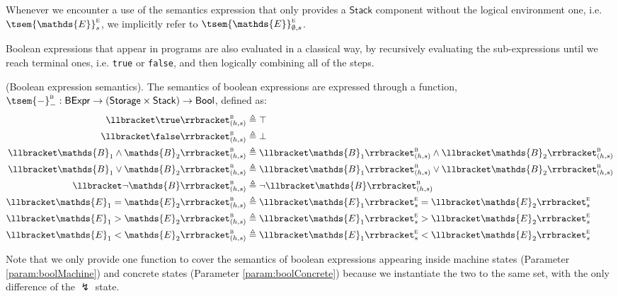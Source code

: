 Whenever we encounter a use of the semantics expression that only provides a $\mathsf{Stack}$ component without the logical environment one, i.e. $\tsem{\mathds{E}}_s^\textsc{e}$, we implicitly refer to $\tsem{\mathds{E}}_{\emptyset, s}^\textsc{e}$.

Boolean expressions that appear in programs are also evaluated in a classical way, by recursively evaluating the sub-expressions until we reach terminal ones, i.e. \texttt{true} or \texttt{false}, and then logically combining all of the steps.
\begin{defn}
	(Boolean expression semantics).
	The semantics of boolean expressions are expressed through a function, $\tsem{-}_-^\textsc{b} : \mathsf{BExpr} \rightarrow (\mathsf{Storage} \times \mathsf{Stack}) \rightarrow \mathsf{Bool}$, defined as:
	\begin{align*}
		\llbracket \true \rrbracket_{(h, s)}^\textsc{b} &\triangleq \top \\
		\llbracket \false \rrbracket_{(h, s)}^\textsc{b} &\triangleq \bot \\
		\llbracket \mathds{B}_1 \land \mathds{B}_2 \rrbracket_{(h, s)}^\textsc{b} &\triangleq \llbracket \mathds{B}_1 \rrbracket_{(h, s)}^\textsc{b} \land \llbracket \mathds{B}_2 \rrbracket_{(h, s)}^\textsc{b} \\
		\llbracket \mathds{B}_1 \lor \mathds{B}_2 \rrbracket_{(h, s)}^\textsc{b} &\triangleq \llbracket \mathds{B}_1 \rrbracket_{(h, s)}^\textsc{b} \lor \llbracket \mathds{B}_2 \rrbracket_{(h, s)}^\textsc{b} \\
		\llbracket \lnot \mathds{B} \rrbracket_{(h, s)}^\textsc{b} &\triangleq \lnot \llbracket \mathds{B} \rrbracket_{(h, s)}^\textsc{b} \\
		\llbracket \mathds{E}_1 = \mathds{E}_2 \rrbracket_{(h, s)}^\textsc{b} &\triangleq \llbracket \mathds{E}_1 \rrbracket_{s}^\textsc{e} = \llbracket \mathds{E}_2 \rrbracket_{s}^\textsc{e} \\
		\llbracket \mathds{E}_1 > \mathds{E}_2 \rrbracket_{(h, s)}^\textsc{b} &\triangleq \llbracket \mathds{E}_1 \rrbracket_{s}^\textsc{e} > \llbracket \mathds{E}_2 \rrbracket_{s}^\textsc{e} \\
		\llbracket \mathds{E}_1 < \mathds{E}_2 \rrbracket_{(h, s)}^\textsc{b} &\triangleq \llbracket \mathds{E}_1 \rrbracket_{s}^\textsc{e} < \llbracket \mathds{E}_2 \rrbracket_{s}^\textsc{e}
	\end{align*}
\end{defn}
Note that we only provide one function to cover the semantics of boolean expressions appearing inside machine states (Parameter \ref{param:boolMachine}) and concrete states (Parameter \ref{param:boolConcrete}) because we instantiate the two to the same set, with the only difference of the $\lightning$ state.

